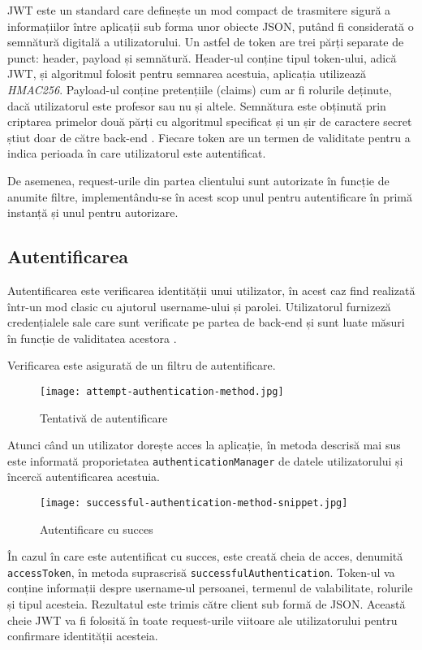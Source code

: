 JWT este un standard care definește un mod compact de trasmitere sigură a informațiilor între aplicații sub forma unor obiecte JSON, putând fi considerată o semnătură digitală a utilizatorului. Un astfel de token are trei părți separate de punct: header, payload și semnătură. Header-ul conține tipul token-ului, adică JWT, și algoritmul folosit pentru semnarea acestuia, aplicația \thesistitle utilizează \textit{HMAC256}. Payload-ul conține pretențiile (claims) cum ar fi rolurile deținute, dacă utilizatorul este profesor sau nu și altele. Semnătura este obținută prin criptarea primelor două părți cu algoritmul specificat și un șir de caractere secret știut doar de către back-end \cite{jwt}. Fiecare token are un termen de validitate pentru a indica perioada în care utilizatorul este autentificat.

De asemenea, request-urile din partea clientului sunt autorizate în funcție de anumite filtre, implementându-se în acest scop unul pentru autentificare în primă instanță și unul pentru autorizare.

\subsection{Autentificarea}

Autentificarea este verificarea identității unui utilizator, în acest caz find realizată într-un mod clasic cu ajutorul username-ului și parolei. Utilizatorul furnizeză credențialele sale care sunt verificate pe partea de back-end și sunt luate măsuri în funcție de validitatea acestora \cite{spring-security}.

Verificarea este asigurată de un filtru de autentificare.

\begin{figure}[H]
	\centering
	\texttt{[image: attempt-authentication-method.jpg]}
	\caption{Tentativă de autentificare}
\end{figure}

Atunci când un utilizator dorește acces la aplicație, în metoda descrisă mai sus este informată proporietatea \texttt{authenticationManager} de datele utilizatorului și încercă autentificarea acestuia.

\begin{figure}[H]
	\centering
	\texttt{[image: successful-authentication-method-snippet.jpg]}
	\caption{Autentificare cu succes}
\end{figure}

În cazul în care este autentificat cu succes, este creată cheia de acces, denumită \texttt{accessToken}, în metoda suprascrisă \texttt{successfulAuthentication}. Token-ul va conține informații despre username-ul persoanei, termenul de valabilitate, rolurile și tipul acesteia. Rezultatul este trimis către client sub formă de JSON. Această cheie JWT va fi folosită în toate request-urile viitoare ale utilizatorului pentru confirmare identității acesteia.

